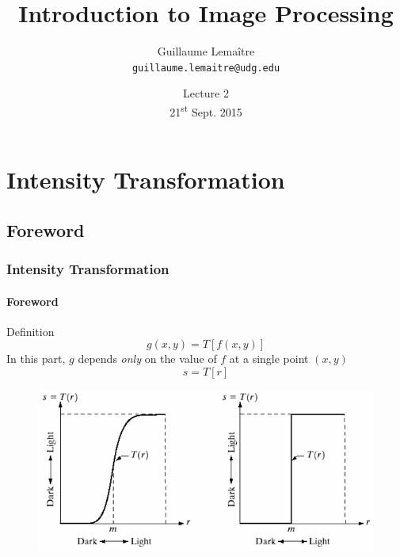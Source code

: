 \documentclass[table]{beamer}
\title{Introduction to Image Processing}
\author{Guillaume Lema\^itre \\ \texttt{guillaume.lemaitre@udg.edu}}
\date{Lecture 2\\ 21\textsuperscript{st} Sept. 2015}
\institute{Universit\'e de Bourgogne}
\begin{document}
\begin{frame}
  \titlepage
\end{frame}

\begin{frame}
  \tableofcontents[sectionstyle=show,subsectionstyle=show,subsubsectionstyle=hide]
\end{frame}

\section{Intensity Transformation}

\subsection{Foreword}

\begin{frame}
  \frametitle{Intensity Transformation}
  \framesubtitle{Foreword}
  \begin{block}{Definition}\footnotesize
    \begin{equation}
      g(x,y) = T[f(x, y)]
    \end{equation}In this part, $g$ depends \emph{only} on the value of $f$ at a single point $(x,y)$
    \begin{equation}
      s = T[r]
    \end{equation}
    \begin{figure}
      \centering
      \includegraphics[height=.4\textheight]{./images/cont_stretch.png}
    \end{figure}
  \end{block}
\end{frame}
\end{document}
